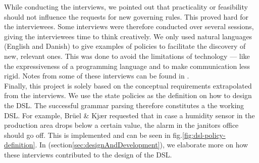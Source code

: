 While conducting the interviews, we pointed out that practicality or feasibility should not influence the requests for new governing rules. This proved hard for the interviewees. Some interviews were therefore conducted over several sessions, giving the interviewees time to think creatively. We only used natural languages (English and Danish) to give examples of policies to facilitate the discovery of new, relevant ones. This was done to avoid the limitations of technology --- like the expressiveness of a programming language and to make communication less rigid.
Notes from some of these interviews can be found in .\\

Finally, this project is solely based on the conceptual requirements extrapolated from the interviews. We use the state policies as the definition on how to design the DSL. The successful grammar parsing therefore constitutes a the working DSL. For example, Br\"{u}el \& Kj\ae r requested that in case a humidity sensor in the production area drops below a certain value, the alarm in the janitors office should go off. This is implemented and can be seen in fig.\ref{fig:dsl-policy-definition}. In  (section\ref{sec:designAndDevelopment}), we elaborate more on how these interviews contributed to the design of the DSL.